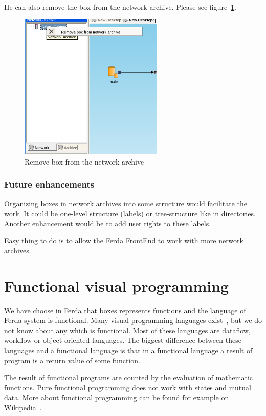 \documentclass[a4paper,12pt]{book}
\begin{document}
He can also remove the box from the network archive. Please see figure~\ref{fig:removeFromNA}.
\begin{figure}
	\centering
	\includegraphics[height=7cm]{network_archive_remove_box}
	\caption{Remove box from the network archive}
	\label{fig:removeFromNA}
\end{figure}

\subsubsection{Future enhancements}
Organizing boxes in network archives into some structure would facilitate the work. It could be one-level structure (labels) or tree-structure like in directories. Another enhancement would be to add user rights to these labels.

Easy thing to do is to allow the Ferda FrontEnd to work with more network archives.

\section{Functional visual programming}
We have choose in Ferda that boxes represents functions and the language of Ferda system is functional. Many visual programming languages exist~\cite{WikiVisualProgrammingLaguage}, but we do not know about any which is functional. Most of these languages are dataflow, workflow or object-oriented languages. The biggest difference between these languages and a functional language is that in a functional language a result of program is a return value of some function.

The result of functional programs are counted by the evaluation of mathematic functions. Pure functional programming does not work with states and mutual data. More about functional programming can be found for example on Wikipedia~\cite{WikiFunctionalProgramming}.
\end{document}
